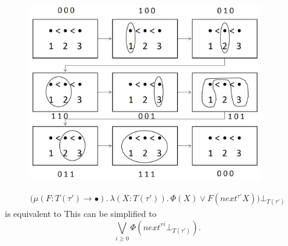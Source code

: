 \begin{frame}
\begin{figure}[ht]
{  }
\end{figure}

\end{frame}
\begin{frame}

\begin{figure}[ht]
	\centering
  \includegraphics[width=0.9\textwidth]{next-set.png}
\end{figure}

\end{frame}
\begin{frame}

    \begin{align*}
        \big(\mu (F \colon T(\tau') \rightarrow \bullet).\, \lambda (X \colon T(\tau')).\,
        \Phi(X)
        \vee F(next^{\tau'} X)\big)\bot_{T(\tau')}
    \end{align*}    
     is equivalent to
     {This can be simplified to
    \[\underset{i\geq0}{\bigvee} \Phi({next^{\tau}}^i \bot_{T(\tau')}).\]}

\end{frame}

